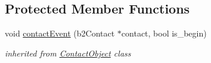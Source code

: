 \subsection*{Protected Member Functions}
\begin{DoxyCompactItemize}
\item 
\mbox{\label{class_non_static_obj_af2a40f79983a88c185c0bf9977e2d50d}} 
void \hyperlink{class_non_static_obj_af2a40f79983a88c185c0bf9977e2d50d}{contact\+Event} (b2\+Contact $\ast$contact, bool is\+\_\+begin)
\begin{DoxyCompactList}\small\item\em inherited from \hyperlink{class_contact_object}{Contact\+Object} class \end{DoxyCompactList}\end{DoxyCompactItemize}
